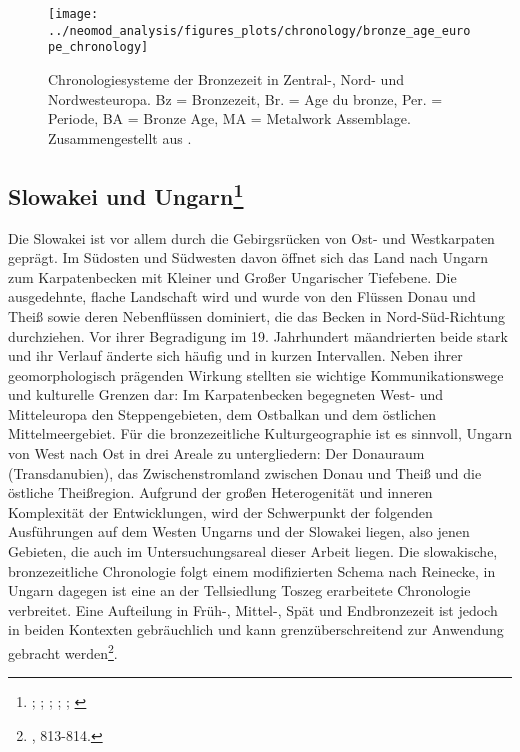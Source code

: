 \documentclass[openany,twoside,twocolumn]{book}
\let\rmarkdownfootnote\footnote%
\def\footnote{\protect\rmarkdownfootnote}
\begin{document}
\begin{landscape}
\begin{figure}
\texttt{[image: ../neomod\_analysis/figures\_plots/chronology/bronze\_age\_europe\_chronology]} \caption[Chronologiesysteme der Bronzezeit in Zentral-, Nord- und Nordwesteuropa]{Chronologiesysteme der Bronzezeit in Zentral-, Nord- und Nordwesteuropa. Bz = Bronzezeit, Br. = Age du bronze, Per. = Periode, BA = Bronze Age, MA = Metalwork Assemblage. Zusammengestellt aus \textcite{roberts_old_2013}.}\label{fig:general-chronology}
\end{figure}
\end{landscape}

\hypertarget{slowakei-und-ungarn}{%
\subsection[Slowakei und Ungarn]{\texorpdfstring{Slowakei und
Ungarn\footnote{\textcite{furmanek_bronzezeit_1999};
  \textcite{kemenczei_spatbronzezeit_1984};
  \textcite{lochner_bestattungssitten_2013};
  \textcite{markova_slovakia_2013}; \textcite{sorensen_landscapes_2008};
  \textcite{vicze_bestattungen_1992}}}{Slowakei und Ungarn}}\label{slowakei-und-ungarn}}

Die Slowakei ist vor allem durch die Gebirgsrücken von Ost- und
Westkarpaten geprägt. Im Südosten und Südwesten davon öffnet sich das
Land nach Ungarn zum Karpatenbecken mit Kleiner und Großer Ungarischer
Tiefebene. Die ausgedehnte, flache Landschaft wird und wurde von den
Flüssen Donau und Theiß sowie deren Nebenflüssen dominiert, die das
Becken in Nord-Süd-Richtung durchziehen. Vor ihrer Begradigung im 19.
Jahrhundert mäandrierten beide stark und ihr Verlauf änderte sich häufig
und in kurzen Intervallen. Neben ihrer geomorphologisch prägenden
Wirkung stellten sie wichtige Kommunikationswege und kulturelle Grenzen
dar: Im Karpatenbecken begegneten West- und Mitteleuropa den
Steppengebieten, dem Ostbalkan und dem östlichen Mittelmeergebiet. Für
die bronzezeitliche Kulturgeographie ist es sinnvoll, Ungarn von West
nach Ost in drei Areale zu untergliedern: Der Donauraum (Transdanubien),
das Zwischenstromland zwischen Donau und Theiß und die östliche
Theißregion. Aufgrund der großen Heterogenität und inneren Komplexität
der Entwicklungen, wird der Schwerpunkt der folgenden Ausführungen auf
dem Westen Ungarns und der Slowakei liegen, also jenen Gebieten, die
auch im Untersuchungsareal dieser Arbeit liegen. Die slowakische,
bronzezeitliche Chronologie folgt einem modifizierten Schema nach
Reinecke, in Ungarn dagegen ist eine an der Tellsiedlung Toszeg
erarbeitete Chronologie verbreitet. Eine Aufteilung in Früh-, Mittel-,
Spät und Endbronzezeit ist jedoch in beiden Kontexten gebräuchlich und
kann grenzüberschreitend zur Anwendung gebracht werden\footnote{\textcite{markova_slovakia_2013},
  813-814.}.
\end{document}
